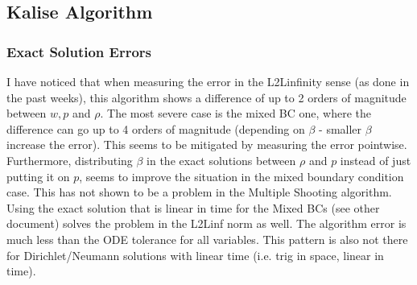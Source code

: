 \documentclass[11pt, a4paper]{article}
\theoremstyle{definition}
\begin{document}
\subsection*{Kalise Algorithm}
\subsubsection*{Exact Solution Errors}
I have noticed that when measuring the error in the L2Linfinity sense (as done in the past weeks), this algorithm shows a difference of up to 2 orders of magnitude between $w,p$ and $\rho$. The most severe case is the mixed BC one, where the difference can go up to 4 orders of magnitude (depending on $\beta$ - smaller $\beta$ increase the error).
This seems to be mitigated by measuring the error pointwise. Furthermore, distributing $\beta$ in the exact solutions between $\rho$ and $p$ instead of just putting it on $p$, seems to improve the situation in the mixed boundary condition case.
This has not shown to be a problem in the Multiple Shooting algorithm.
Using the exact solution that is linear in time for the Mixed BCs (see other document) solves the problem in the L2Linf norm as well. The algorithm error is much less than the ODE tolerance for all variables.
This pattern is also not there for Dirichlet/Neumann solutions with linear time (i.e. trig in space, linear in time).
\end{document}
